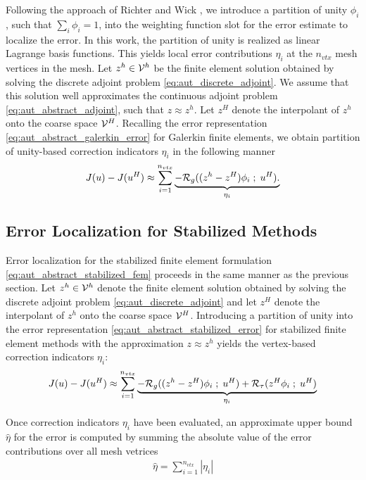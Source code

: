 Following the approach of Richter and Wick
\cite{richter2015variational}, we introduce a partition of unity $\phi_i$, such that
$\sum_i \phi_i = 1$, into the weighting function slot for the
error estimate to localize the error. In this work, the partition of unity is
realized as linear Lagrange basis functions. This yields
local error contributions $\eta_i$ at the $n_{vtx}$ mesh
vertices in the mesh.  Let $z^h \in \mathcal{V}^h$ be the finite element
solution obtained by solving the discrete adjoint problem
\eqref{eq:aut_discrete_adjoint}. We assume that this solution
well approximates the continuous adjoint problem \eqref{eq:aut_abstract_adjoint},
such that $z \approx z^h$. Let $z^H$ denote the interpolant of $z^h$
onto the coarse space $\mathcal{V}^H$. Recalling the error representation
\eqref{eq:aut_abstract_galerkin_error} for Galerkin finite elements,
we obtain partition of unity-based correction indicators $\eta_i$ in the following
manner
%
\begin{gather}
J(u) - J(u^H) \approx
\sum_{i=1}^{n_{vtx}}
\underbrace{
- \mathcal{R}_g( (z^h - z^H) \phi_i \; ; \; u^H).
}_{\eta_i}
\label{eq:aut_galerkin_localization}
\end{gather}

\subsection{Error Localization for Stabilized Methods}

Error localization for the stabilized finite element formulation
\eqref{eq:aut_abstract_stabilized_fem} proceeds in the same manner as the
previous section. Let $z^h \in \mathcal{V}^h$ denote the finite element solution
obtained by solving the discrete adjoint problem
\eqref{eq:aut_discrete_adjoint} and let $z^H$ denote the interpolant
of $z^h$ onto the coarse space $\mathcal{V}^H$. Introducing a partition of unity into the
error representation \eqref{eq:aut_abstract_stabilized_error} for stabilized
finite element methods with the approximation $z \approx z^h$ yields
the vertex-based correction indicators $\eta_i$:
%
\begin{gather}
J(u) - J(u^H) \approx
\sum_{i=1}^{n_{vtx}}
\underbrace{
- \mathcal{R}_g( (z^h - z^H) \phi_i \; ; \; u^H) +
\mathcal{R}_{\tau}( z^H \phi_i \; ; \; u^H)
}_{\eta_i}
\label{eq:aut_stabilized_localization}
\end{gather}

Once correction indicators $\eta_i$ have been evaluated, an approximate
upper bound $\hat{\eta}$ for the error is computed by summing the absolute
value of the error contributions over all mesh vetrices
%
\begin{gather}
\hat{\eta} = \sum_{i=1}^{n_{vtx}} | \eta_i |
\label{eq:aut_upper_bound}
\end{gather}

